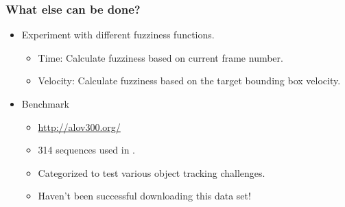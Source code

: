 \begin{frame}
    \frametitle{What else can be done?}
    \begin{itemize}
        \item Experiment with different fuzziness functions.
            \begin{itemize}
                \item Time: Calculate fuzziness based on current frame number.
                \item Velocity: Calculate fuzziness based on the target bounding box velocity.
            \end{itemize}
        \item Benchmark
            \begin{itemize}
                \item \url{http://alov300.org/}
                \item 314 sequences used in \cite{6671560}.
                \item Categorized to test various object tracking challenges.
                \item \alert{Haven't been successful downloading this data set!}
            \end{itemize}
    \end{itemize}
\end{frame}


%


